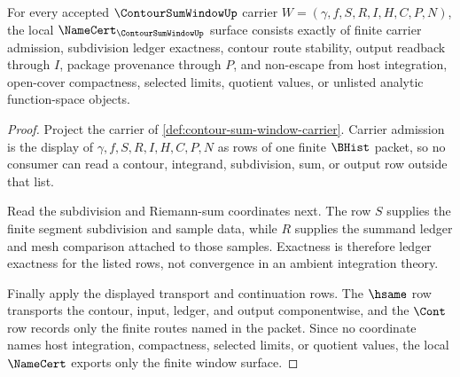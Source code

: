 \begin{theorem}
\label{thm:contour-sum-window-namecert-obligations}
For every accepted $\ContourSumWindowUp$ carrier $W=(\gamma,f,S,R,I,H,C,P,N)$, the local $\NameCert_{\ContourSumWindowUp}$ surface consists exactly of finite carrier admission, subdivision ledger exactness, contour route stability, output readback through $I$, package provenance through $P$, and non-escape from host integration, open-cover compactness, selected limits, quotient values, or unlisted analytic function-space objects.
\end{theorem}
\begin{proof}
Project the carrier of \autoref{def:contour-sum-window-carrier}. Carrier admission is the display of $\gamma,f,S,R,I,H,C,P,N$ as rows of one finite $\BHist$ packet, so no consumer can read a contour, integrand, subdivision, sum, or output row outside that list.

Read the subdivision and Riemann-sum coordinates next. The row $S$ supplies the finite segment subdivision and sample data, while $R$ supplies the summand ledger and mesh comparison attached to those samples. Exactness is therefore ledger exactness for the listed rows, not convergence in an ambient integration theory.

Finally apply the displayed transport and continuation rows. The $\hsame$ row transports the contour, input, ledger, and output componentwise, and the $\Cont$ row records only the finite routes named in the packet. Since no coordinate names host integration, compactness, selected limits, or quotient values, the local $\NameCert$ exports only the finite window surface.
\end{proof}

